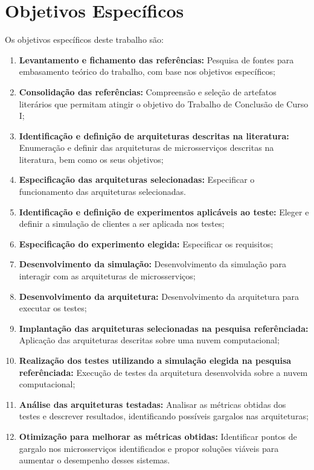 \section{Objetivos Específicos}



Os objetivos específicos deste trabalho são:



\begin{enumerate}
	\item \textbf{Levantamento e fichamento das referências:} Pesquisa de fontes para embasamento teórico do trabalho, com base nos objetivos específicos;
	      
	\item \textbf{Consolidação das referências:} Compreensão e seleção de artefatos literários que permitam atingir o objetivo do Trabalho de Conclusão de Curso I;
	      
	\item \textbf{Identificação e definição de arquiteturas descritas na literatura:} Enumeração e definir das arquiteturas de microsserviços descritas na literatura, bem como os seus objetivos;
	      
	\item \textbf{Especificação das arquiteturas selecionadas:} Especificar o funcionamento das arquiteturas selecionadas.
	      
	\item \textbf{Identificação e definição de experimentos aplicáveis ao teste:} Eleger e definir a simulação de clientes a ser aplicada nos testes;
	      
	\item \textbf{Especificação do experimento elegida:} Especificar os requisitos;
	      
	\item \textbf{Desenvolvimento da simulação:} Desenvolvimento da simulação para interagir com as arquiteturas de microsserviços;
	      
	\item \textbf{Desenvolvimento da arquitetura:} Desenvolvimento da arquitetura para executar os testes;
	      
	\item \textbf{Implantação das arquiteturas selecionadas na pesquisa referênciada:} Aplicação das arquiteturas descritas sobre uma nuvem computacional;
	      
	\item \textbf{Realização dos testes utilizando a simulação elegida na pesquisa referênciada:} Execução de testes da arquitetura desenvolvida sobre a nuvem computacional;
	      
	\item \textbf{Análise das arquiteturas testadas:} Analisar as métricas obtidas dos testes e descrever resultados, identificando possíveis gargalos nas arquiteturas;
	      
	\item \textbf{Otimização para melhorar as métricas obtidas:} Identificar pontos de gargalo nos microsserviços identificados e propor soluções viáveis para aumentar o desempenho desses sistemas.
	      
\end{enumerate}
